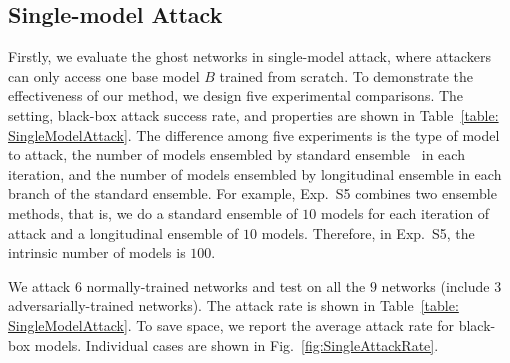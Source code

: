 \documentclass[letterpaper]{article} %
\begin{document}
\subsection{Single-model Attack} \label{sec:singleModelAttackExp}

Firstly, we evaluate the ghost networks in single-model attack, where attackers can only access one base model $B$ trained from scratch. To demonstrate the effectiveness of our method, we design five experimental comparisons. The setting, black-box attack success rate, and properties are shown in Table~\ref{table: SingleModelAttack}. The difference among five experiments is the type of model to attack, the number of models ensembled by standard ensemble~\cite{liu2016delving} in each iteration, and the number of models ensembled by longitudinal ensemble in each branch of the standard ensemble. For example, Exp.~S5 combines two ensemble methods, that is, we do a standard ensemble of $10$ models for each iteration of attack and a longitudinal ensemble of $10$ models. Therefore, in Exp.~S5, the intrinsic number of models is $100$.







We attack $6$ normally-trained networks and test on all the $9$ networks (include $3$ adversarially-trained networks). The attack rate is shown in Table~\ref{table: SingleModelAttack}. To save space, we report the average attack rate for black-box models. Individual cases are shown in Fig.~\ref{fig:SingleAttackRate}.
\end{document}
